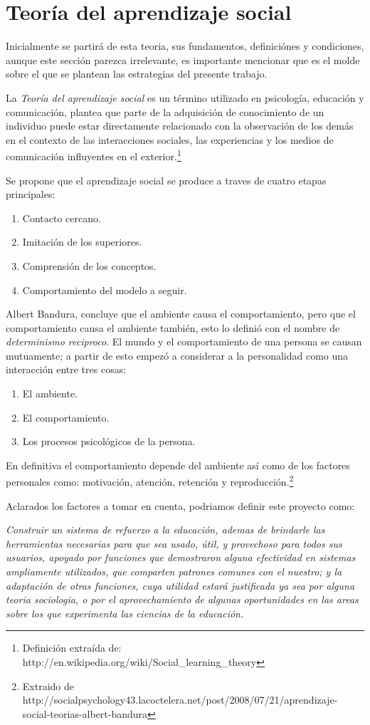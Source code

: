 \section{Teoría del aprendizaje social}
Inicialmente se partirá de esta teoria, sus fundamentos, definiciónes y condiciones, aunque este sección parezca irrelevante, es importante mencionar que es el molde sobre el que se plantean las estrategias del presente trabajo.

La \emph{Teoría del aprendizaje social} es un término utilizado en psicología, educación y comunicación, plantea que
parte de la adquisición de conocimiento de un individuo puede estar directamente relacionado con la observación de los
demás en el contexto de las interacciones sociales, las experiencias y los medios de comunicación influyentes en el
exterior.\footnote{Definición extraída de: http://en.wikipedia.org/wiki/Social\_learning\_theory}

Se propone que el aprendizaje social se produce a traves de cuatro etapas principales:

\begin{enumerate}
\item Contacto cercano.
\item Imitación de los superiores.
\item Comprensión de los conceptos.
\item Comportamiento del modelo a seguir.
\end{enumerate}

Albert Bandura, concluye que el ambiente causa el comportamiento, pero que el comportamiento causa el ambiente también,
esto lo definió con el nombre de \emph{determinismo reciproco}. El mundo y el comportamiento de una persona se causan
mutuamente; a partir de esto empezó a considerar a la personalidad como una interacción entre tres cosas:

\begin{enumerate}
\item El ambiente.
\item El comportamiento.
\item Los procesos psicológicos de la persona.
\end{enumerate}

En definitiva el comportamiento depende del ambiente así como de los factores personales como: motivación, atención, retención y reproducción.\footnote{Extraido de http://socialpsychology43.lacoctelera.net/post/2008/07/21/aprendizaje-social-teorias-albert-bandura}

Aclarados los factores a tomar en cuenta, podriamos definir este proyecto como:

\emph{Construir un sistema de refuerzo a la educación, ademas de brindarle las herramientas necesarias para que sea
usado, útil, y provechoso para todos sus usuarios, apoyado por funciones que demostraron alguna efectividad en sistemas
ampliamente utilizados, que comparten patrones comunes con el nuestro; y la adaptación de otras funciones, cuya utilidad
estará justificada ya sea por alguna teoria sociologia, o por el aprovechamiento de algunas oportunidades en las areas
sobre los que experimenta las ciencias de la educación.}
